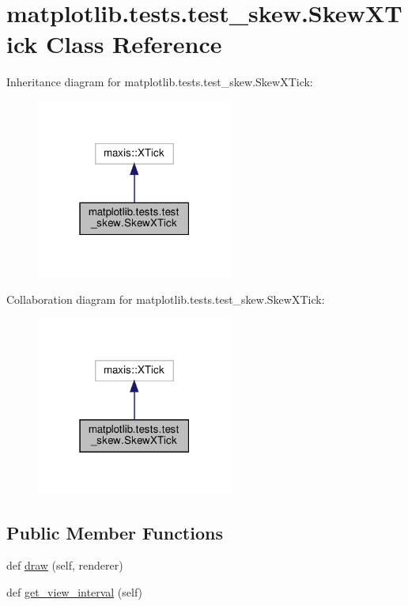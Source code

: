\hypertarget{classmatplotlib_1_1tests_1_1test__skew_1_1SkewXTick}{}\section{matplotlib.\+tests.\+test\+\_\+skew.\+Skew\+X\+Tick Class Reference}
\label{classmatplotlib_1_1tests_1_1test__skew_1_1SkewXTick}


Inheritance diagram for matplotlib.\+tests.\+test\+\_\+skew.\+Skew\+X\+Tick\+:
\nopagebreak
\begin{figure}[H]
\begin{center}
\leavevmode
\includegraphics[width=183pt]{classmatplotlib_1_1tests_1_1test__skew_1_1SkewXTick__inherit__graph}
\end{center}
\end{figure}


Collaboration diagram for matplotlib.\+tests.\+test\+\_\+skew.\+Skew\+X\+Tick\+:
\nopagebreak
\begin{figure}[H]
\begin{center}
\leavevmode
\includegraphics[width=183pt]{classmatplotlib_1_1tests_1_1test__skew_1_1SkewXTick__coll__graph}
\end{center}
\end{figure}
\subsection*{Public Member Functions}
\begin{DoxyCompactItemize}
\item 
def \hyperlink{classmatplotlib_1_1tests_1_1test__skew_1_1SkewXTick_aa61ff97c83399b6a0b5b5447860333ab}{draw} (self, renderer)
\item 
def \hyperlink{classmatplotlib_1_1tests_1_1test__skew_1_1SkewXTick_af95e5340b2fe4329c62a69cc27dd87cd}{get\+\_\+view\+\_\+interval} (self)
\end{DoxyCompactItemize}


